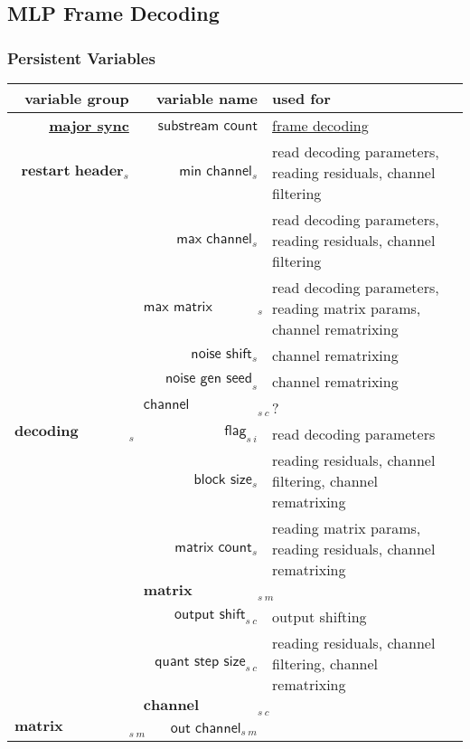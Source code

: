 \begin{landscape}

\subsection{MLP Frame Decoding}
\subsubsection{Persistent Variables}
{
\begin{tabular}{rrl}
\textbf{variable group} & \textbf{variable name} &
\textbf{used for} \\
\hline
\hline
\hyperref[mlp:readmajorsync]{\textbf{major sync}}
& $\textsf{substream count}$
& \hyperref[mlp:framedecoding]{frame decoding} \\
\hline
\hyperref[mlp:readrestartheader]{$\textbf{restart header}_s$}
& $\textsf{min channel}_s$
& read decoding parameters, reading residuals, channel filtering \\
& $\textsf{max channel}_s$
& read decoding parameters, reading residuals, channel filtering \\
& $\textsf{max matrix channel}_s$
& read decoding parameters, reading matrix params, channel rematrixing \\
& $\textsf{noise shift}_s$
& channel rematrixing \\
& $\textsf{noise gen seed}_s$
& channel rematrixing \\
& $\textsf{channel assignment}_{s~c}$
& ? \\
\hline
\hyperref[mlp:readdecodingparams]{$\textbf{decoding parameters}_s$}
& $\textsf{flag}_{s~i}$
& read decoding parameters \\
& $\textsf{block size}_s$
& reading residuals, channel filtering, channel rematrixing \\
& $\textsf{matrix count}_s$
& reading matrix params, reading residuals, channel rematrixing \\
& \hyperref[mlp:readmatrixparams]{$\textbf{matrix parameters}_{s~m}$} \\
& $\textsf{output shift}_{s~c}$
& output shifting \\
& $\textsf{quant step size}_{s~c}$
& reading residuals, channel filtering, channel rematrixing \\
& \hyperref[mlp:readchannelparams]{$\textbf{channel parameters}_{s~c}$} \\
\hline
\hyperref[mlp:readmatrixparams]{$\textbf{matrix parameters}_{s~m}$}
& $\textsf{out channel}_{s~m}$

\end{tabular}}
\end{landscape}
